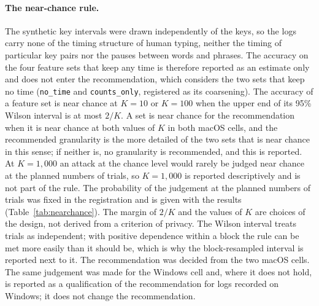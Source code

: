 \paragraph{The near-chance rule.} The synthetic key intervals were drawn independently of the keys, so the logs carry
none of the timing structure of human typing, neither the timing of particular key pairs nor the pauses between words
and phrases. The accuracy on the four feature sets that keep any time is therefore reported as an estimate only and
does not enter the recommendation, which considers the two sets that keep no time (\texttt{no\_time} and
\texttt{counts\_only}, registered as its coarsening). The accuracy of a feature set is near chance at $K=10$ or $K=100$
when the upper
end of its 95\% Wilson interval is at most $2/K$. A set is near chance for the recommendation when it is near chance at
both values of $K$ in both macOS cells, and the recommended granularity is the more detailed of the two sets that is
near chance in this sense; if neither is, no granularity is recommended, and this is reported. At $K=1{,}000$ an attack
at the chance level would rarely be judged near chance at the planned numbers of trials, so $K=1{,}000$ is reported
descriptively and is not part of the rule. The probability of the judgement at the planned numbers of trials was fixed
in the registration and is given with the results (Table~\ref{tab:nearchance}). The margin of $2/K$ and the values of
$K$ are choices of the design, not derived from a criterion of privacy. The Wilson interval treats trials as
independent; with positive dependence within a block the rule can be met more easily than it should be, which is why the
block-resampled interval is reported next to it. The recommendation was decided from the two macOS cells. The same
judgement was made for the Windows cell and, where it does not hold, is reported as a qualification of the
recommendation for logs recorded on Windows; it does not change the recommendation.

